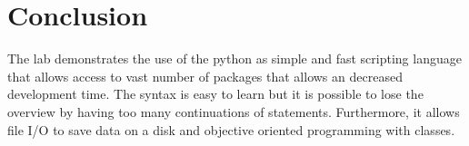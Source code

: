 \section{Conclusion}\label{sec: Conclusion}
The lab demonstrates the use of the python as simple and fast scripting language that allows access to vast number of packages that allows an decreased development time. The syntax is easy to learn but it is possible to lose the overview by having too many continuations of statements. Furthermore, it allows file I/O to save data on a disk and objective oriented programming with classes.


